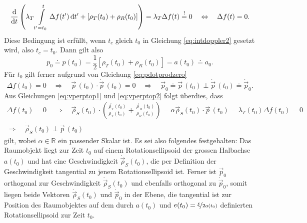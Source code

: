 \documentclass[a4paper,12pt]{article}
\numberwithin{equation}{section}
\begin{document}
\begin{gather}
\frac{\mathrm{d}}{\mathrm{d}t}\left(\lambda_T\int\displaylimits_{t^\prime = t_0}^{t} \Delta f(t^\prime) \, \mathrm{d}t^\prime + [\rho_T(t_0)+\rho_R(t_0)]\right) = \lambda_T\Delta f(t) \overset{!}{=} 0 \quad \Leftrightarrow \quad \Delta f(t) = 0.
\end{gather} Diese Bedingung ist erfüllt, wenn $t_c$ gleich $t_0$ in Gleichung \eqref{eq:intdoppler2} gesetzt wird, also $t_c = t_0$. Dann gilt also \begin{equation}\label{eq:atnullidenttoptnull}
p_0 \doteq p(t_0) = \frac{1}{2}[\rho_T(t_0)+\rho_R(t_0)] = a(t_0) \doteq a_0.
\end{equation} Für $t_0$ gilt ferner aufgrund von Gleichung \eqref{eq:pdotprodzero} \begin{equation}\label{eq:pperptopdot}
\Delta f(t_0) = 0 \quad \Rightarrow \quad \vec{p}\,(t_0)\cdot \dot{\vec{p}}\,(t_0) = 0 \quad \Rightarrow \quad \vec{p}_0 \doteq \vec{p}\,(t_0) \perp \dot{\vec{p}}\,(t_0) \doteq \dot{\vec{p}}_0.
\end{equation} Aus Gleichungen \eqref{eq:vperptop1} und \eqref{eq:vperptop2} folgt überdies, dass \begin{gather}
\Delta f(t_0) = 0 \quad \Rightarrow \quad \dot{\vec{\rho}}_S(t_0) \cdot \left(\frac{\vec{\rho}_T(t_0)}{\rho_T(t_0)}+\frac{\vec{\rho}_R(t_0)}{\rho_R(t_0)}\right) = \alpha \dot{\vec{\rho}}_S(t_0)\cdot \vec{p}\,(t_0) = \lambda_T(t_0)\Delta f(t_0)  = 0 \nonumber \\ \Rightarrow \quad \dot{\vec{\rho}}_S(t_0) \perp \vec{p}\,(t_0)
\end{gather} gilt, wobei $\alpha \in \mathbb{R}$ ein passender Skalar ist. Es sei also folgendes festgehalten: Das Raumobjekt liegt zur Zeit $t_0$ auf einem Rotationsellipsoid der grossen Halbachse $a(t_0)$ und hat eine Geschwindigkeit $\dot{\vec{\rho}}_S(t_0)$, die per Definition der Geschwindigkeit tangential zu jenem Rotationsellipsoid ist. Ferner ist $\vec{p}_0$ orthogonal zur Geschwindigkeit $\dot{\vec{\rho}}_S(t_0)$ und ebenfalls orthogonal zu $\dot{\vec{p}}_0$, somit liegen beide Vektoren $\dot{\vec{\rho}}_S(t_0)$ und $\dot{\vec{p}}_0$ in der Ebene, die tangential ist zur Position des Raumobjektes auf dem durch $a(t_0)$ und $e(t_0)=\nicefrac{\xi}{2a(t_0)}$ definierten Rotationsellipsoid zur Zeit $t_0$.
\end{document}
